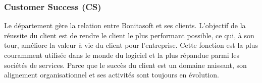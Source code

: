 \subsubsection{Customer Success (CS)}
Le département gère la relation entre Bonitasoft et ses clients. L'objectif de la réussite du client est de rendre le client le plus performant possible, ce qui, à son tour, améliore la valeur à vie du client pour l'entreprise.
Cette fonction est la plus couramment utilisée dans le monde du logiciel et la plus répandue parmi les sociétés de services. Parce que le succès du client est un domaine naissant, son alignement organisationnel et ses activités sont toujours en évolution.
